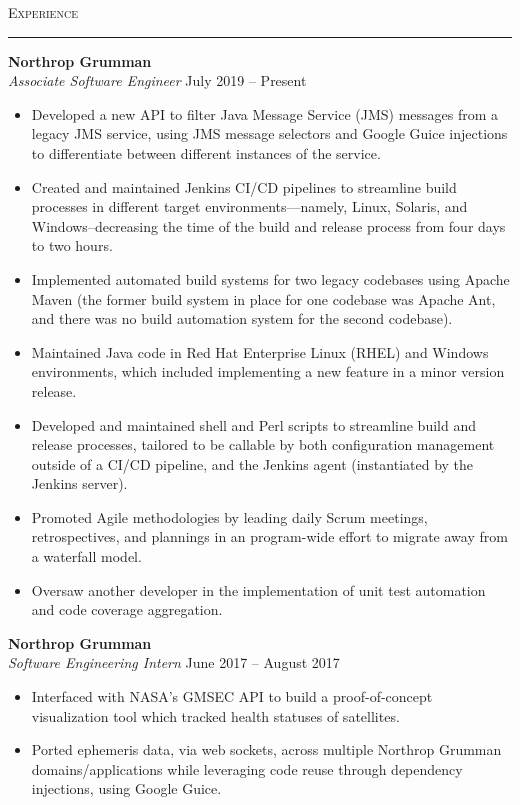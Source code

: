 \documentclass{res}
\begin{document}
\begin{resume}
\textsc{{\Large Experience}}
\vspace{0.5mm}
\hrule width18.5cm
\textbf{Northrop Grumman}\\
\textit{Associate Software Engineer}
\hfill
July 2019 -- Present\\[1mm]
	\begin{itemize}
		\vspace{-3mm}
    \item Developed a new API to filter Java Message Service (JMS) messages from a legacy JMS service, using JMS message selectors and Google Guice injections to differentiate between different instances of the service.
    \item Created and maintained Jenkins CI/CD pipelines to streamline build processes in different target environments--–namely, Linux, Solaris, and Windows--decreasing the time of the build and release process from four days to two hours.
    \item Implemented automated build systems for two legacy codebases using Apache Maven (the former build system in place for one codebase was Apache Ant, and there was no build automation system for the second codebase).
    \item Maintained Java code in Red Hat Enterprise Linux (RHEL) and Windows environments, which included implementing a new feature in a minor version release.
    \item Developed and maintained shell and Perl scripts to streamline build and release processes, tailored to be callable by both configuration management outside of a CI/CD pipeline, and the Jenkins agent (instantiated by the Jenkins server).
    \item Promoted Agile methodologies by leading daily Scrum meetings, retrospectives, and plannings in an program-wide effort to migrate away from a waterfall model.
    \item Oversaw another developer in the implementation of unit test automation and code coverage aggregation.
  \end{itemize}
\textbf{Northrop Grumman}\\
\textit{Software Engineering Intern}
\hfill
June 2017 -- August 2017\\[1mm]
	\begin{itemize}
		\vspace{-3mm}
  \item Interfaced with NASA's GMSEC API to build a proof-of-concept visualization tool which tracked health statuses of satellites.
  \item Ported ephemeris data, via web sockets, across multiple Northrop Grumman domains/applications while leveraging code reuse through dependency injections, using Google Guice.
	\end{itemize}


\end{resume}
\end{document}
